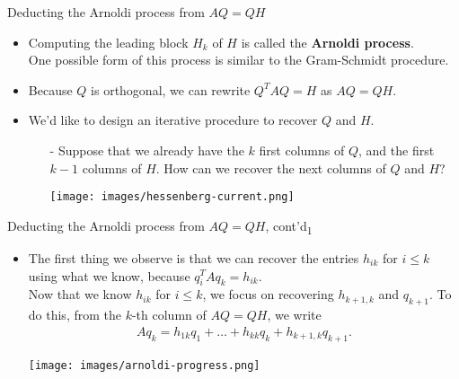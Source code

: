 \documentclass[t,usepdftitle=false]{beamer}
\begin{document}
\begin{frame}{Deducting the Arnoldi process from $AQ=QH$}
\begin{itemize}
\item Computing the leading block $H_k$ of $H$ is called the \textbf{Arnoldi process}.\\
One possible form of this process is similar to the Gram-Schmidt procedure.
\item Because $Q$ is orthogonal, we can rewrite $Q^TAQ=H$ as $AQ=QH$.
\item We'd like to design an iterative procedure to recover $Q$ and $H$.\vspace{.1cm}\\
\begin{itemize}\normalsize
\item[-] Suppose that we already have the $k$ first columns of $Q$, and the first $k-1$ columns of $H$. How can we recover the next columns of $Q$ and $H$?
\begin{center}
\texttt{[image: images/hessenberg-current.png]}
\end{center}
\end{itemize}
\end{itemize}
\end{frame}

\begin{frame}{Deducting the Arnoldi process from $AQ=QH$, cont'd\textsubscript{1}}
\begin{itemize}
\item The first thing we observe is that we can recover the entries $h_{ik}$ for $i\leq k$ using what we know, because $q_i^TAq_k=h_{ik}$.\\
Now that we know $h_{ik}$ for $i\leq k$, we focus on recovering $h_{k+1,k}$ and $q_{k+1}$.
To do this, from the $k$-th column of $AQ=QH$, we write
\begin{align*}
Aq_k=h_{1k}q_1+\dots+h_{kk}q_k+h_{k+1,k}q_{k+1}.
\end{align*}
\begin{center}
\texttt{[image: images/arnoldi-progress.png]}
\end{center}
\end{itemize}
\end{frame}
	
\end{document}

